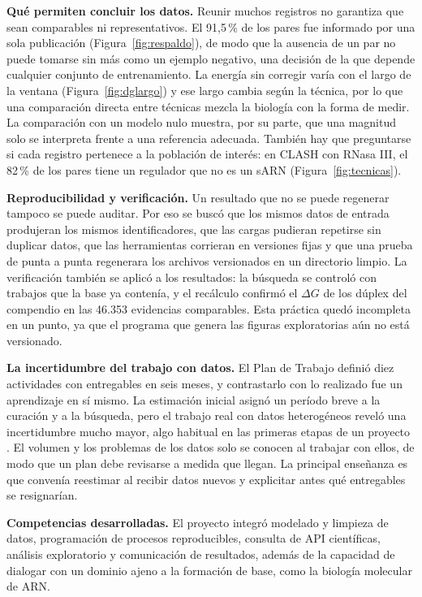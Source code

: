 \documentclass[11pt,a4paper]{article}
\newcommand{\dG}{$\Delta G$}
\begin{document}
\textbf{Qué permiten concluir los datos.} Reunir muchos registros no garantiza que sean comparables ni representativos. El 91,5\,\% de los pares fue informado por una sola publicación (Figura~\ref{fig:respaldo}), de modo que la ausencia de un par no puede tomarse sin más como un ejemplo negativo, una decisión de la que depende cualquier conjunto de entrenamiento. La energía sin corregir varía con el largo de la ventana (Figura~\ref{fig:dglargo}) y ese largo cambia según la técnica, por lo que una comparación directa entre técnicas mezcla la biología con la forma de medir. La comparación con un modelo nulo muestra, por su parte, que una magnitud solo se interpreta frente a una referencia adecuada. También hay que preguntarse si cada registro pertenece a la población de interés: en CLASH con RNasa III, el 82\,\% de los pares tiene un regulador que no es un sARN (Figura~\ref{fig:tecnicas}).

\textbf{Reproducibilidad y verificación.} Un resultado que no se puede regenerar tampoco se puede auditar. Por eso se buscó que los mismos datos de entrada produjeran los mismos identificadores, que las cargas pudieran repetirse sin duplicar datos, que las herramientas corrieran en versiones fijas y que una prueba de punta a punta regenerara los archivos versionados en un directorio limpio. La verificación también se aplicó a los resultados: la búsqueda se controló con trabajos que la base ya contenía, y el recálculo confirmó el \dG{} de los dúplex del compendio en las 46.353 evidencias comparables. Esta práctica quedó incompleta en un punto, ya que el programa que genera las figuras exploratorias aún no está versionado.

\textbf{La incertidumbre del trabajo con datos.} El Plan de Trabajo definió diez actividades con entregables en seis meses, y contrastarlo con lo realizado fue un aprendizaje en sí mismo. La estimación inicial asignó un período breve a la curación y a la búsqueda, pero el trabajo real con datos heterogéneos reveló una incertidumbre mucho mayor, algo habitual en las primeras etapas de un proyecto \cite{mcconnell2006}. El volumen y los problemas de los datos solo se conocen al trabajar con ellos, de modo que un plan debe revisarse a medida que llegan. La principal enseñanza es que convenía reestimar al recibir datos nuevos y explicitar antes qué entregables se resignarían.

\textbf{Competencias desarrolladas.} El proyecto integró modelado y limpieza de datos, programación de procesos reproducibles, consulta de API científicas, análisis exploratorio y comunicación de resultados, además de la capacidad de dialogar con un dominio ajeno a la formación de base, como la biología molecular de ARN.
\end{document}
